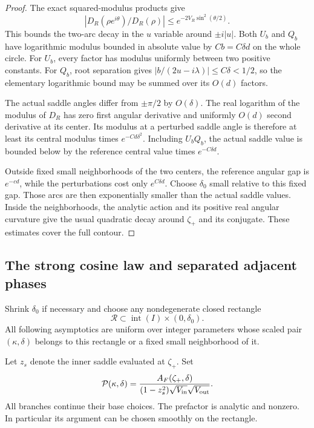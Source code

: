 \documentclass[11pt,a4paper]{article}
\numberwithin{equation}{section}
\begin{document}
\begin{proof}
The exact squared-modulus products give
\[
 \left|D_R(\rho e^{i\theta})/D_R(\rho)\right|
 \le e^{-2V_R\sin^2(\theta/2)}.
\]
This bounds the two-arc decay in the $u$ variable around $\pm i|u|$. Both $U_b$ and $Q_b$ have logarithmic modulus bounded in absolute value by $Cb=C\delta d$ on the whole circle. For $U_b$, every factor has modulus uniformly between two positive constants. For $Q_b$, root separation gives
$|b/(2u-i\lambda)|\le C\delta<1/2$, so the elementary logarithmic bound may be summed over its $O(d)$ factors.

The actual saddle angles differ from $\pm\pi/2$ by $O(\delta)$. The real logarithm of the modulus of $D_R$ has zero first angular derivative and uniformly $O(d)$ second derivative at its center. Its modulus at a perturbed saddle angle is therefore at least its central modulus times $e^{-Cd\delta^2}$. Including $U_bQ_b$, the actual saddle value is bounded below by the reference central value times $e^{-C\delta d}$.

Outside fixed small neighborhoods of the two centers, the reference angular gap is $e^{-c d}$, while the perturbations cost only $e^{C\delta d}$. Choose $\delta_0$ small relative to this fixed gap. Those arcs are then exponentially smaller than the actual saddle values. Inside the neighborhoods, the analytic action and its positive real angular curvature give the usual quadratic decay around $\zeta_+$ and its conjugate. These estimates cover the full contour.
\end{proof}

\subsection{The strong cosine law and separated adjacent phases}
Shrink $\delta_0$ if necessary and choose any nondegenerate closed rectangle
\[
 \mathcal R\subset\operatorname{int}(I)\times(0,\delta_0).
\]
All following asymptotics are uniform over integer parameters whose scaled pair $(\kappa,\delta)$ belongs to this rectangle or a fixed small neighborhood of it.

Let $z_s$ denote the inner saddle evaluated at $\zeta_+$. Set
\begin{equation}\label{aud:qg:prefactor}
 \mathcal P(\kappa,\delta)
 =\frac{A_F(\zeta_+,\delta)}
 {(1-z_s^2)\sqrt{V_{\rm in}}\sqrt{V_{\rm out}}}.
\end{equation}
All branches continue their base choices. The prefactor is analytic and nonzero. In particular its argument can be chosen smoothly on the rectangle.
\end{document}
